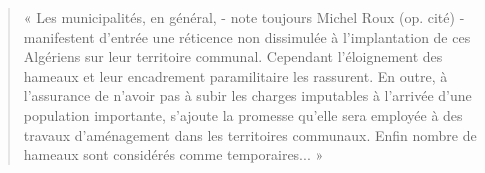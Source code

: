 \begin{quote}
« Les municipalités, en général, - note toujours Michel Roux (op. cité) - manifestent
d’entrée une réticence non dissimulée à l’implantation de ces Algériens sur leur
territoire communal. Cependant l’éloignement des hameaux et leur encadrement
paramilitaire les rassurent. En outre, à l’assurance de n’avoir pas à subir les charges
imputables à l’arrivée d’une population importante, s’ajoute la promesse qu’elle sera
employée à des travaux d’aménagement dans les territoires communaux. Enfin
nombre de hameaux sont considérés comme temporaires... »
\end{quote}
